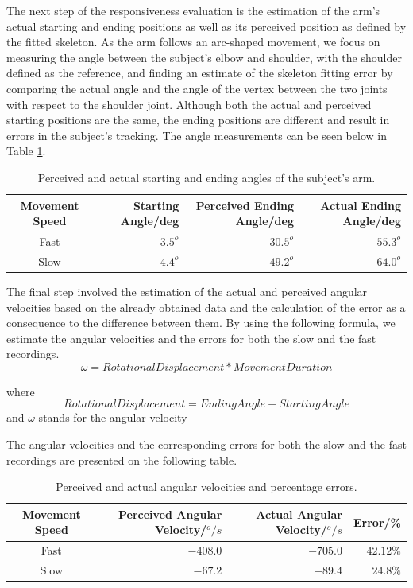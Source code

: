 \documentclass[a4paper]{article}
\begin{document}
The next step of the responsiveness evaluation is the estimation of the arm's actual starting and ending positions as well as its perceived position as defined by the fitted skeleton. As the arm follows an arc-shaped movement, we focus on measuring the angle between the subject's elbow and shoulder, with the shoulder  defined as the reference, and finding an estimate of the skeleton fitting error by comparing the actual angle and the angle of the vertex between the two joints with respect to the shoulder joint. Although both the actual and perceived starting positions are the same, the ending positions are different and result in errors in the subject's tracking. The angle measurements can be seen below in Table \ref{angle}.

\begin{table}[H]
\center
\begin{tabular}{| c | r | r | r |}
\hline
Movement Speed & Starting Angle/deg & Perceived Ending Angle/deg & Actual Ending Angle/deg\\
\hline
Fast & $3.5^o$ & $-30.5^o$ & $-55.3^o$\\
Slow & $4.4^o$ & $-49.2^o$ & $-64.0^o$\\
\hline
\end{tabular}
\caption{Perceived and actual starting and ending angles of the subject's arm.}
\label{angle}
\end{table}

The final step involved the estimation of the actual and perceived angular velocities based on the already obtained data and the calculation of the error as a consequence to the difference between them. By using the following formula, we estimate the angular velocities and the errors for both the slow and the fast recordings.
\begin{equation}
\omega = RotationalDisplacement * MovementDuration
\end{equation}

\noindent where \[RotationalDisplacement = EndingAngle - StartingAngle\]
and  $\omega$ stands for the angular velocity

\noindent The angular velocities and the corresponding errors for both the slow and the fast recordings are presented on the following table.

\begin{table}[H]
\center
\begin{tabular}{| c | r | r | r |}
\hline
Movement Speed & Perceived Angular Velocity/$^o/s$ & Actual Angular Velocity/$^o/s$ & Error/\% \\
\hline
Fast & $-408.0$ & $-705.0$ & $42.12\%$ \\
Slow & $-67.2$ & $-89.4$ & $24.8\%$ \\
\hline
\end{tabular}
\caption{Perceived and actual angular velocities and percentage errors.}
\end{table}
\end{document}
